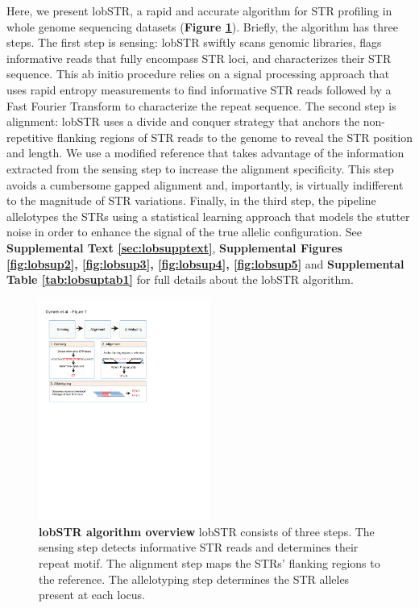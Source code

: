 Here, we present lobSTR, a rapid and accurate algorithm for STR profiling in whole genome sequencing datasets (\textbf{Figure \ref{fig:lobfig1}}). Briefly, the algorithm has three steps. The first step is sensing: lobSTR swiftly scans genomic libraries, flags informative reads that fully encompass STR loci, and characterizes their STR sequence. This ab initio procedure relies on a signal processing approach that uses rapid entropy measurements to find informative STR reads followed by a Fast Fourier Transform to characterize the repeat sequence. The second step is alignment: lobSTR uses a divide and conquer strategy that anchors the non-repetitive flanking regions of STR reads to the genome to reveal the STR position and length. We use a modified reference that takes advantage of the information extracted from the sensing step to increase the alignment specificity. This step avoids a cumbersome gapped alignment and, importantly, is virtually indifferent to the magnitude of STR variations. Finally, in the third step, the pipeline allelotypes the STRs using a statistical learning approach that models the stutter noise in order to enhance the signal of the true allelic configuration. See \textbf{Supplemental Text \ref{sec:lobsupptext}}, \textbf{Supplemental Figures \ref{fig:lobsup2}, \ref{fig:lobsup3}, \ref{fig:lobsup4}, \ref{fig:lobsup5}} and \textbf{Supplemental Table \ref{tab:lobsuptab1}} for full details about the lobSTR algorithm.

\begin{figure}[h!]
\centering
\label{fig:lobfig1}
\includegraphics[width=0.5\textwidth]{Figures/Chapter2/Fig1.pdf}
\caption{\textbf{lobSTR algorithm overview} lobSTR consists of three steps. The sensing step detects informative STR reads and determines their repeat motif. The alignment step maps the STRs' flanking regions to the reference. The allelotyping step determines the STR alleles present at each locus.}
\end{figure}

